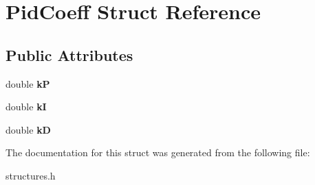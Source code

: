 \hypertarget{struct_pid_coeff}{}\section{Pid\+Coeff Struct Reference}
\label{struct_pid_coeff}
\subsection*{Public Attributes}
\begin{DoxyCompactItemize}
\item 
double {\bfseries kP}\hypertarget{struct_pid_coeff_ac197194a5709f444836560eb26c72529}{}\label{struct_pid_coeff_ac197194a5709f444836560eb26c72529}

\item 
double {\bfseries kI}\hypertarget{struct_pid_coeff_ab0fbc32f5a94c8656d0bf8b22361d175}{}\label{struct_pid_coeff_ab0fbc32f5a94c8656d0bf8b22361d175}

\item 
double {\bfseries kD}\hypertarget{struct_pid_coeff_a26142a9100b6d62fd007712190113939}{}\label{struct_pid_coeff_a26142a9100b6d62fd007712190113939}

\end{DoxyCompactItemize}


The documentation for this struct was generated from the following file\+:\begin{DoxyCompactItemize}
\item 
structures.\+h\end{DoxyCompactItemize}
